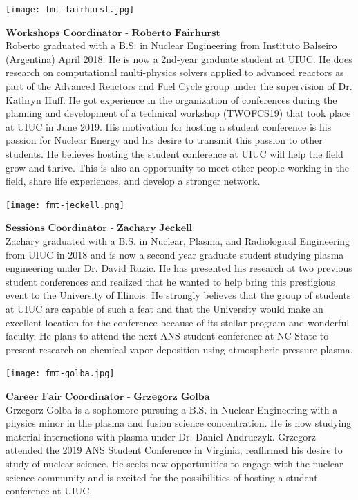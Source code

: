\begin{minipage}{0.25\textwidth}
	\centering
	\texttt{[image: fmt-fairhurst.jpg]}
\end{minipage}
\begin{minipage}{0.73\textwidth}
	$\textbf{Workshops Coordinator - Roberto Fairhurst}$\\
Roberto graduated with a B.S. in Nuclear Engineering from Instituto Balseiro (Argentina) April 2018. He is now a 2nd-year graduate student at UIUC. He does research on computational multi-physics solvers applied to advanced reactors as part of the Advanced Reactors and Fuel Cycle group under the supervision of Dr. Kathryn Huff. He got experience in the organization of conferences during the planning and development of a technical workshop (TWOFCS19) that took place at UIUC in June 2019. His motivation for hosting a student conference is his passion for Nuclear Energy and his desire to transmit this passion to other students. He believes hosting the student conference at UIUC will help the field grow and thrive. This is also an opportunity to meet other people working in the field, share life experiences, and develop a stronger network.
\end{minipage}

\begin{minipage}{0.25\textwidth}
	\centering
	\texttt{[image: fmt-jeckell.png]}
\end{minipage}
\begin{minipage}{0.73\textwidth}
$\textbf{Sessions Coordinator - Zachary Jeckell}$\\
	Zachary graduated with a B.S. in Nuclear, Plasma, and Radiological Engineering from UIUC in 2018 and is now a second year graduate student studying plasma engineering under Dr. David Ruzic. He has presented his research at two previous student conferences  and realized that he wanted to help bring this prestigious event to the University of Illinois. He strongly believes that the group of students at UIUC are capable of such a feat and that the University would make an excellent location for the conference because of its stellar program and wonderful faculty. He plans to attend the next ANS student conference at NC State to present research on chemical vapor deposition using atmospheric pressure plasma. 
\end{minipage}

\begin{minipage}{0.25\textwidth}
	\centering
	\texttt{[image: fmt-golba.jpg]}
\end{minipage}
\begin{minipage}{0.73\textwidth}
$\textbf{Career Fair Coordinator - Grzegorz Golba}$\\
	Grzegorz Golba is a sophomore pursuing a B.S. in Nuclear Engineering with a physics minor in the plasma and fusion science concentration. He is now studying material interactions with plasma under Dr. Daniel Andruczyk. Grzegorz attended the 2019 ANS Student Conference in Virginia, reaffirmed his desire to study of nuclear science. He seeks new opportunities to engage with the nuclear science community and is excited for the possibilities of hosting a student conference at UIUC. 
\end{minipage}

